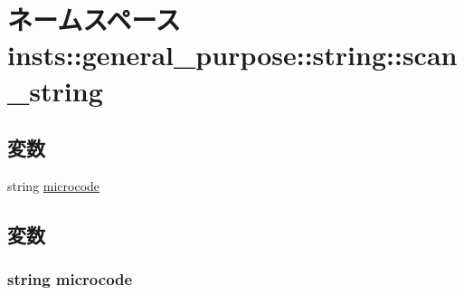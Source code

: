 \hypertarget{namespaceinsts_1_1general__purpose_1_1string_1_1scan__string}{
\section{ネームスペース insts::general\_\-purpose::string::scan\_\-string}
\label{namespaceinsts_1_1general__purpose_1_1string_1_1scan__string}
}
\subsection*{変数}
\begin{DoxyCompactItemize}
\item 
string \hyperlink{namespaceinsts_1_1general__purpose_1_1string_1_1scan__string_a770f11a173e99389a8802f0107ed8f52}{microcode}
\end{DoxyCompactItemize}


\subsection{変数}
\hypertarget{namespaceinsts_1_1general__purpose_1_1string_1_1scan__string_a770f11a173e99389a8802f0107ed8f52}{
\subsubsection[{microcode}]{\setlength{\rightskip}{0pt plus 5cm}string {\bf microcode}}}
\label{namespaceinsts_1_1general__purpose_1_1string_1_1scan__string_a770f11a173e99389a8802f0107ed8f52}
